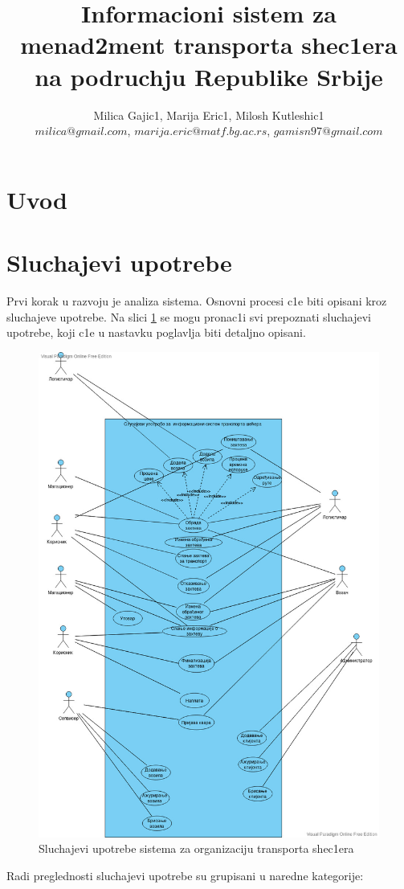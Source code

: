 \documentclass{article}
\title{\textbf{Informacioni sistem za menad2ment transporta shec1era na podruchju Republike Srbije}}
\author{Milica Gajic1, Marija Eric1, Milosh Kutleshic1\\
$milica@gmail.com$, $marija.eric@matf.bg.ac.rs$, $gamisn97@gmail.com$}
\begin{document}
\maketitle
\newpage


\renewcommand*\contentsname{Sadrz1aj}
\tableofcontents
\newpage

\section{Uvod}


\section{Sluchajevi upotrebe}
Prvi korak u razvoju je analiza sistema. Osnovni procesi c1e biti opisani kroz sluchajeve upotrebe. 
Na slici \ref{sistem} se mogu pronac1i svi prepoznati sluchajevi upotrebe, koji c1e u nastavku poglavlja biti detaljno opisani.
\begin{figure}[H]
    \includegraphics[scale = 0.4]{Slike/UML/SlucajeviUpotrebeSistema.jpg}
    \centering
    \caption{Sluchajevi upotrebe sistema za organizaciju transporta shec1era}
    \label{sistem}
\end{figure}  
Radi preglednosti sluchajevi upotrebe su grupisani u naredne kategorije:
\end{document}
